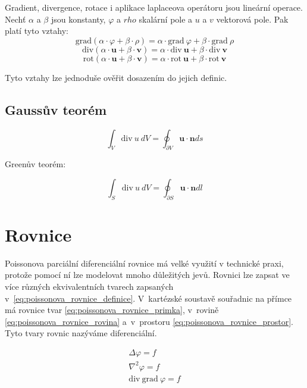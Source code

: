 \documentclass{book}
\newcommand{\vect}[1]{\boldsymbol{#1}}
\newcommand{\grad}{\mathrm{grad}}
\newcommand{\diverg}{\mathrm{div}}
\newcommand{\rot}{\mathrm{rot}}
\begin{document}
Gradient, divergence, rotace i aplikace laplaceova operátoru jsou lineární operace. Nechť \(\alpha\) a \(\beta\) jsou konstanty, \(\varphi\) a \(rho\) skalární pole a \(u\) a \(v\) vektorová pole. Pak platí tyto vztahy:
\[
\grad(\alpha \cdot \varphi + \beta \cdot \rho) = \alpha \cdot \grad \ \varphi + \beta \cdot \grad \ \rho
\]
\[
\diverg(\alpha \cdot \vect{u} + \beta \cdot \vect{v}) = \alpha \cdot \diverg \ \vect{u} + \beta \cdot \diverg \ \vect{v}
\]
\[
\rot(\alpha \cdot \vect{u} + \beta \cdot \vect{v}) = \alpha \cdot \rot \ \vect{u} + \beta \cdot \rot \ \vect{v}
\]

Tyto vztahy lze jednoduše ověřit dosazením do jejich definic.


\section{Gaussův teorém}

\begin{equation}
\int_V \diverg \ u \ dV = \oint_{\partial V} \vect{u} \cdot \vect{n} ds
\end{equation}


Greenův teorém:

\begin{equation}
\int_S \diverg \ u \ dV = \oint_{\partial S} \vect{u} \cdot \vect{n} dl
\end{equation}

\chapter{Rovnice}

Poissonova parciální diferenciální rovnice má velké využití v technické praxi, protože pomocí ní lze modelovat mnoho důležitých jevů.
Rovnici lze zapsat ve více různých ekvivalentních tvarech zapsaných v~\eqref{eq:poissonova_rovnice_definice}. V~kartézské soustavě souřadnic na přímce má rovnice tvar \eqref{eq:poissonova_rovnice_primka}, v~rovině
\eqref{eq:poissonova_rovnice_rovina} a~v~prostoru \eqref{eq:poissonova_rovnice_prostor}. Tyto tvary rovnic nazýváme diferenciální.

\begin{equation}
\label{eq:poissonova_rovnice_definice}
\begin{split}
\Delta \varphi = f \\
\nabla^2 \varphi = f \\
\diverg \ \grad \ \varphi = f
\end{split}
\end{equation}
\end{document}

